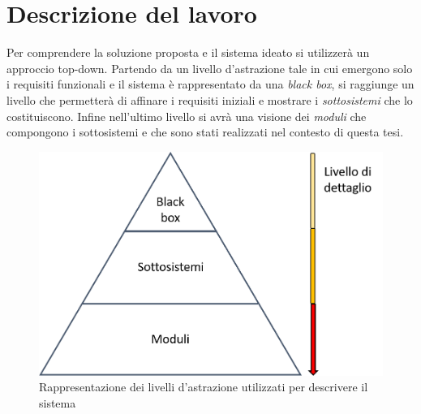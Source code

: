\chapter{Descrizione del lavoro}
\label{descrizioeDelLavoro}
Per comprendere la soluzione proposta e il sistema ideato si utilizzerà un approccio top-down. Partendo da un livello d'astrazione tale in cui emergono solo i requisiti funzionali e il sistema è rappresentato da una \textit{black box}, si raggiunge un livello che permetterà di affinare i requisiti iniziali e mostrare i \textit{sottosistemi} che lo costituiscono. Infine nell'ultimo livello si avrà una visione dei \textit{moduli} che compongono i sottosistemi e che sono stati realizzati nel contesto di questa tesi.
\begin{figure}[H]
	\centering
	\includegraphics[scale=0.4]{DescrizioneDelSistema/livelli_astrazione.png}
	\caption{Rappresentazione dei livelli d'astrazione utilizzati per descrivere il sistema }
	\label{fig:livelliAstrazione}
\end{figure}
\newpage

